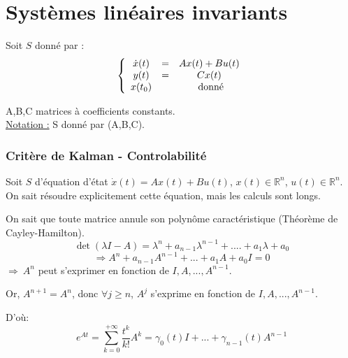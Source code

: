 \part{Systèmes linéaires invariants}
Soit $S$ donné par :
\[\left\{ \begin{array}{c c c}
\dot{x}(t)&=&Ax(t)+Bu(t)\\
y(t)&=&Cx(t)\\
x(t_0) & &\text{ donné}
\end{array}\right.\]

A,B,C matrices à coefficients constants.\\
\underline{Notation :} S donné par (A,B,C).

\section{Critère de Kalman - Controlabilité}
Soit $S$ d'équation d'état $\dot{x}(t)=Ax(t)+Bu(t)$, $x(t)\in\mathbb{R}^n$, $u(t)\in\mathbb{R}^n$.\\
On sait résoudre explicitement cette équation, mais les calculs sont longs.


\begin{dem}
On sait que toute matrice annule son polynôme caractéristique (Théorème de Cayley-Hamilton).\\
\[\det(\lambda I-A)=\lambda^n+a_{n-1}\lambda^{n-1}+....+a_1\lambda+a_0\]
\[\Rightarrow A^n+a_{n-1}A^{n-1}+...+a_1A+a_0I=0\]
$\Rightarrow\ A^n$ peut s'exprimer en fonction de $I,A,...,A^{n-1}$.

\bigskip
Or, $A^{n+1}=A^n$, donc $\forall j\geq n$, $A^j$ s'exprime en fonction de $I,A,...,A^{n-1}$.

D'où:
\[e^{At}=\sum_{k=0}^{+\infty} \frac{t^k}{k!} A^k = \gamma_0(t)I+...+\gamma_{n-1}(t)A^{n-1}\]
\end{dem}


